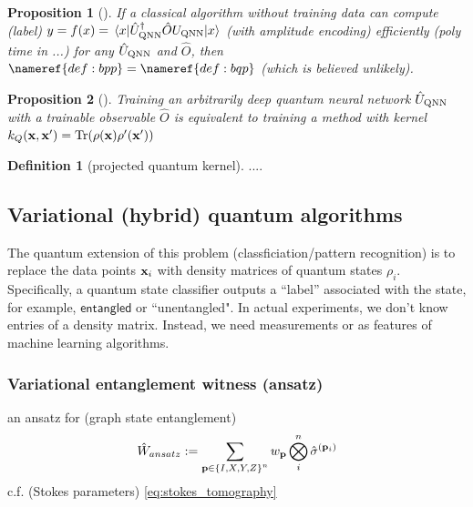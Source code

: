 \documentclass[
10pt,
aps,
pra,
linenumbers,
floatfix,
]{revtex4-2}
\theoremstyle{plain}
\newtheorem{proposition}{Proposition}
\theoremstyle{definition}
\newtheorem{definition}{Definition}
\newcommand{\ew}{\hat{W}}
\newcommand{\entangled}{\textsf{entangled}}
\newcommand{\qnn}{\textup{QNN}}
\newcommand{\ob}{\hat{O}}
\newcommand{\U}{\hat{U}}
\newcommand{\dm}{\rho}
\begin{document}
\begin{proposition}[\cite{huangPowerDataQuantum2021}]
	If a classical algorithm without training data can compute (label) $y=f(x)=\mel{x}{\U_{\textup{QNN}}^\dagger \ob U_{\textup{QNN}}}{x}$ (with amplitude encoding) efficiently (poly time in ...) for any $\U_{\textup{QNN}}$ and $\ob$, then $\nameref{def:bpp}=\nameref{def:bqp}$ (which is believed unlikely).
\end{proposition}
\begin{proposition}[\cite{huangPowerDataQuantum2021}]
	Training an arbitrarily deep quantum neural network $\U_{\qnn}$ with a trainable observable $\ob$ is equivalent to training a  method with kernel $k_{Q}(\vbx,\vbx')=\Tr(\dm(\vbx)\dm'(\vbx'))$
\end{proposition}
\begin{definition}[projected quantum kernel]\label{def:projected_quantum_kernel}
	....
\end{definition}



\subsection{Variational (hybrid) quantum algorithms}
The quantum extension of this problem (classficiation/pattern recognition) is to replace the data points $\vb{x}_i$ with density matrices of quantum states $\dm_i$. 
Specifically, a quantum state classifier outputs a “label” associated with the state, for example, $\entangled$ or ``unentangled".
In actual experiments, we don't know entries of a density matrix.
Instead, we need measurements or  as features of machine learning algorithms.

\subsubsection{Variational entanglement witness (ansatz)}
an ansatz for  \cite{zhuMachineLearningDerivedEntanglement2021} (graph state entanglement)
\begin{equation}
	\ew_{ansatz} := 
	\sum_{\vb{p}\in \qty{I,X,Y,Z}^n} w_{\vb{p}}  \bigotimes_i^n \hat{\sigma}^{(\vb{p}_i)}
\end{equation}
c.f.  (Stokes parameters) \cref{eq:stokes_tomography}
\end{document}
